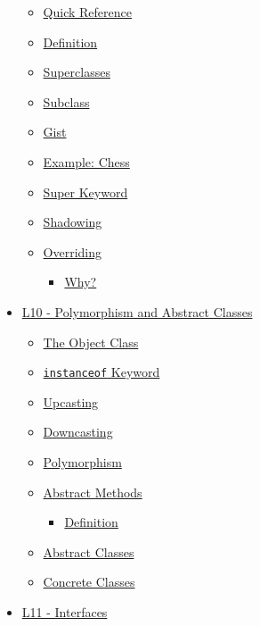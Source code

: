 \documentclass[]{article}
\providecommand{\tightlist}{%
  \setlength{\itemsep}{0pt}\setlength{\parskip}{0pt}}
\begin{document}
\begin{itemize}
  \begin{itemize}
  \tightlist
  \item
    \protect\hyperlink{quick-reference}{Quick Reference}
  \item
    \protect\hyperlink{definition}{Definition}
  \item
    \protect\hyperlink{superclasses}{Superclasses}
  \item
    \protect\hyperlink{subclass}{Subclass}
  \item
    \protect\hyperlink{gist}{Gist}
  \item
    \protect\hyperlink{example-chess}{Example: Chess}
  \item
    \protect\hyperlink{super-keyword}{Super Keyword}
  \item
    \protect\hyperlink{shadowing}{Shadowing}
  \item
    \protect\hyperlink{overriding}{Overriding}

    \begin{itemize}
    \tightlist
    \item
      \protect\hyperlink{whyux3f}{Why?}
    \end{itemize}
  \end{itemize}
\item
  \protect\hyperlink{l10---polymorphism-and-abstract-classes}{L10 -
  Polymorphism and Abstract Classes}

  \begin{itemize}
  \tightlist
  \item
    \protect\hyperlink{the-object-class}{The Object Class}
  \item
    \protect\hyperlink{ux5cux2560instanceofux5cux2560-keyword}{\texttt{instanceof}
    Keyword}
  \item
    \protect\hyperlink{upcasting}{Upcasting}
  \item
    \protect\hyperlink{downcasting}{Downcasting}
  \item
    \protect\hyperlink{polymorphism}{Polymorphism}
  \item
    \protect\hyperlink{abstract-methods}{Abstract Methods}

    \begin{itemize}
    \tightlist
    \item
      \protect\hyperlink{definition}{Definition}
    \end{itemize}
  \item
    \protect\hyperlink{abstract-classes}{Abstract Classes}
  \item
    \protect\hyperlink{concrete-classes}{Concrete Classes}
  \end{itemize}
\item
  \protect\hyperlink{l11---interfaces}{L11 - Interfaces}


\end{itemize}
\end{document}
